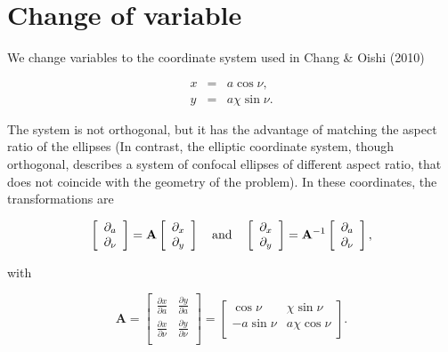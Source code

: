 \documentclass[apj]{emulateapj}
\newcommand{\pderiv}[2]{\frac{\partial #1}{\partial #2}}
\newcommand{\vt}[1]{\mathbf{#1}}       %
\renewcommand{\v}[1]{{\boldsymbol{#1}}} %
\newcommand{\beq}{\begin{equation}}
\newcommand{\eeq}{\end{equation}}
\newcommand{\beqn}{\begin{eqnarray}}
\newcommand{\eeqn}{\end{eqnarray}}
\begin{document}
\section{Change of variable}

We change variables to the coordinate system used in Chang \& Oishi (2010)

\beqn
  x &=& a \cos\nu, \label{eq:change-x}\\
  y &=& a\chi\sin\nu.  \label{eq:change-y}
\eeqn

The system is not orthogonal, but it has the advantage of matching the
aspect ratio of the ellipses (In contrast, the elliptic coordinate
system, though orthogonal, describes a system of confocal ellipses of
different aspect ratio, that does not coincide with the geometry of
the problem). In these coordinates, the transformations are 


\beq
\left[\begin{array}{c}
    \partial_{a}  \\
    \partial_{\nu}
  \end{array}\right] = \vt{A} 
  \left[\begin{array}{c}
      \partial_{x}  \\
      \partial_{y}
    \end{array}\right] 
%
\quad {\rm and} \quad 
%
\left[\begin{array}{c}
    \partial_{x}  \\
    \partial_{y}
  \end{array}\right] = \vt{A}^{-1} 
  \left[\begin{array}{c}
      \partial_{a}  \\
      \partial_{\nu}
    \end{array}\right],  
%
\eeq

\noindent with 

\beq
\vt{A} = \left[\begin{array}{cc}
\pderiv{x}{a}  & \pderiv{y}{a}  \\
\pderiv{x}{\nu}  & \pderiv{y}{\nu} \\
\end{array}\right] = \left[\begin{array}{cc}
\cos\nu  & \chi\sin\nu  \\
-a\sin\nu  & a\chi\cos\nu \\
\end{array}\right]. 
\eeq
\end{document}
